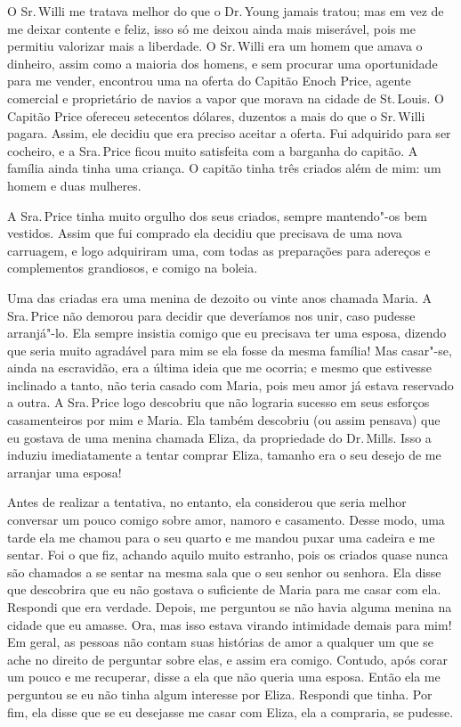 O Sr.\,Willi me tratava melhor do que o Dr.\,Young jamais tratou; mas em
vez de me deixar contente e feliz, isso só me deixou ainda mais
miserável, pois me permitiu valorizar mais a liberdade. O Sr.\,Willi era
um homem que amava o dinheiro, assim como a maioria dos homens, e sem
procurar uma oportunidade para me vender, encontrou uma na oferta do
Capitão Enoch Price, agente comercial e proprietário de navios a vapor
que morava na cidade de St.\,Louis. O Capitão Price ofereceu setecentos
dólares, duzentos a mais do que o Sr.\,Willi pagara. Assim, ele decidiu
que era preciso aceitar a oferta. Fui adquirido para ser cocheiro, e a
Sra.\,Price ficou muito satisfeita com a barganha do capitão. A família
ainda tinha uma criança. O capitão tinha três criados além de mim: um
homem e duas mulheres.

A Sra.\,Price tinha muito orgulho dos seus criados, sempre mantendo"-os
bem vestidos. Assim que fui comprado ela decidiu que precisava de uma
nova carruagem, e logo adquiriram uma, com todas as preparações para
adereços e complementos grandiosos, e comigo na boleia.

Uma das criadas era uma menina de dezoito ou vinte anos chamada Maria. A
Sra.\,Price não demorou para decidir que deveríamos nos unir, caso
pudesse arranjá"-lo. Ela sempre insistia comigo que eu precisava ter uma
esposa, dizendo que seria muito agradável para mim se ela fosse da mesma
família! Mas casar"-se, ainda na escravidão, era a última ideia que me
ocorria; e mesmo que estivesse inclinado a tanto, não teria casado com
Maria, pois meu amor já estava reservado a outra. A Sra.\,Price logo
descobriu que não lograria sucesso em seus esforços casamenteiros por
mim e Maria. Ela também descobriu (ou assim pensava) que eu gostava de
uma menina chamada Eliza, da propriedade do Dr.\,Mills. Isso a induziu
imediatamente a tentar comprar Eliza, tamanho era o seu desejo de me
arranjar uma esposa!

Antes de realizar a tentativa, no entanto, ela considerou que seria
melhor conversar um pouco comigo sobre amor, namoro e casamento. Desse
modo, uma tarde ela me chamou para o seu quarto e me mandou puxar uma
cadeira e me sentar. Foi o que fiz, achando aquilo muito estranho, pois
os criados quase nunca são chamados a se sentar na mesma sala que o seu
senhor ou senhora. Ela disse que descobrira que eu não gostava o
suficiente de Maria para me casar com ela. Respondi que era verdade.
Depois, me perguntou se não havia alguma menina na cidade que eu amasse.
Ora, mas isso estava virando intimidade demais para mim! Em geral, as
pessoas não contam suas histórias de amor a qualquer um que se ache no
direito de perguntar sobre elas, e assim era comigo. Contudo, após corar
um pouco e me recuperar, disse a ela que não queria uma esposa. Então
ela me perguntou se eu não tinha algum interesse por Eliza. Respondi que
tinha. Por fim, ela disse que se eu desejasse me casar com Eliza, ela a
compraria, se pudesse.

